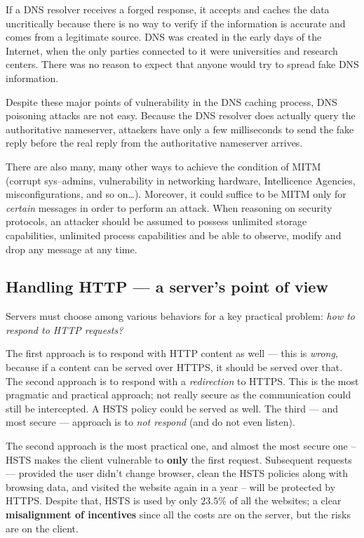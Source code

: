 \documentclass[10pt]{\classname}
\begin{document}
If a DNS resolver receives a forged response, it accepts and caches the data
uncritically because there is no way to verify if the information is accurate
and comes from a legitimate source. DNS was created in the early days of the
Internet, when the only parties connected to it were universities and research
centers. There was no reason to expect that anyone would try to spread fake DNS
information.

Despite these major points of vulnerability in the DNS caching process, DNS
poisoning attacks are not easy. Because the DNS resolver does actually query
the authoritative nameserver, attackers have only a few milliseconds to send
the fake reply before the real reply from the authoritative nameserver arrives.

There are also many, many other ways to achieve the condition of MITM (corrupt
sys--admins, vulnerability in networking hardware, Intellicence Agencies,
misconfigurations, and so on\dots). Moreover, it could suffice to be MITM only
for \emph{certain} messages in order to perform an attack. When reasoning on
security protocols, an attacker should be assumed to possess unlimited storage
capabilities, unlimited process capabilities and be able to observe, modify and
drop any message at any time.

\subsection{Handling HTTP --- a server's point of view}

Servers must choose among various behaviors for a key practical problem:
\emph{how to respond to HTTP requests?}

The first approach is to respond with HTTP content as well --- this is
\emph{wrong}, because if a content can be served over HTTPS, it should be
served over that. The second approach is to respond with a \emph{redirection}
to HTTPS. This is the most pragmatic and practical approach; not really secure
as the communication could still be intercepted. A HSTS policy could be served
as well. The third --- and most secure --- approach is to \emph{not respond} (and
do not even listen).

The second approach is the most practical one, and almost the most secure one
-- HSTS makes the client vulnerable to \textbf{only} the first request.
Subsequent requests --- provided the user didn't change browser, clean the HSTS
policies along with browsing data, and visited the website again in a year --
will be protected by HTTPS. Despite that, HSTS is used by only $23.5\%$ of all
the websites; a clear \textbf{misalignment of incentives} since all the costs
are on the server, but the risks are on the client.
\end{document}
